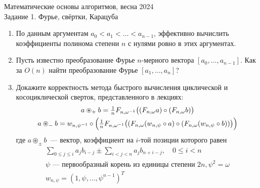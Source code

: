 \documentclass[11pt]{article}
\newenvironment{exercise}{\item}{}
\newcommand{\w}{\omega}
\newcommand{\bigpa}[1]{\bigl(#1\bigr)}
\newcommand{\Bigpa}[1]{\Bigl(#1\Bigr)}
\begin{document}
\begin{center}
	\Large Математические основы алгоритмов, весна 2024 \\
	\Large Задание 1. Фурье, свёртки, Карацуба
\end{center}


\begin{enumerate}

\begin{exercise}
По данным аргументам $a_0 < a_1 < \ldots < a_{n-1}$,
эффективно вычислить коэффициенты полинома степени $n$ с нулями ровно в этих аргументах.
\end{exercise}

\begin{exercise}
Пусть известно преобразование Фурье \(n\)-мерного вектора \([a_0, \ldots, a_{n-1}]\).
Как за \(O(n)\) найти преобразование Фурье \([a_1, \ldots, a_n]\)?
\end{exercise}

\begin{exercise}
Докажите корректность метода быстрого вычисления циклической и косоциклической сверток,
представленного в лекциях:
%
\begin{gather*}
\textstyle a \circledast_+ b = \frac{1}{n} F_{n,\w^{-1}}\bigpa{(F_{n,\w}a)\circ (F_{n,\w}b)}\\
%
\textstyle a \circledast_- b = w_{n,\psi^{-1}} \circ 
\Bigpa{\frac{1}{n} F_{n,\w^{-1}}\bigpa{
  (F_{n,\w} (w_{n,\psi} \circ a)\circ (F_{n,\w} (w_{n,\psi} \circ b))}}
\end{gather*}
%
где \(a \circledast_{\pm} b\)~— вектор, коэффициент на \(i\)-той позиции которого равен
%
\begin{gather*}
  \sum_{0 \leq j \leq i} a_j b_{i-j} \pm 
  \sum_{i < j < n} a_j b_{n+i-j},\quad 0 \leq i < n\\
\text{$\psi$ --- первообразный корень из единицы степени $2n$},
\psi^2 = \w\\
w_{n,\psi} = (1,\psi,\ldots,\psi^{n-1})^T
\end{gather*}
\end{exercise}


\end{enumerate}
\end{document}
